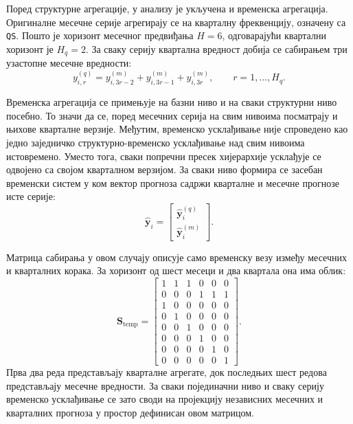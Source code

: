 \documentclass[12pt,oneside]{memoir}
\begin{document}
Поред структурне агрегације, у анализу је укључена и временска агрегација. Оригиналне месечне серије агрегирају се на кварталну фреквенцију, означену са \texttt{QS}. Пошто је хоризонт месечног предвиђања $H=6$, одговарајући квартални хоризонт је $H_q=2$. За сваку серију квартална вредност добија се сабирањем три узастопне месечне вредности:
\begin{equation}
    y^{(q)}_{i,r}
    =
    y^{(m)}_{i,3r-2}
    +
    y^{(m)}_{i,3r-1}
    +
    y^{(m)}_{i,3r},
    \qquad r = 1,\dots,H_q.
\end{equation}

Временска агрегација се примењује на базни ниво и на сваки структурни ниво посебно. То значи да се, поред месечних серија на свим нивоима посматрају и њихове кварталне верзије. Међутим, временско усклађивање није спроведено као једно заједничко структурно-временско усклађивање над свим нивоима истовремено. Уместо тога, сваки попречни пресек хијерархије усклађује се одвојено са својом кварталном верзијом. За сваки ниво формира се засебан временски систем у ком вектор прогноза садржи кварталне и месечне прогнозе исте серије:
\begin{equation}
    \hat{\mathbf{y}}_{i}
    =
    \begin{bmatrix}
        \hat{\mathbf{y}}^{(q)}_{i} \\
        \hat{\mathbf{y}}^{(m)}_{i}
    \end{bmatrix}.
\end{equation}

Матрица сабирања у овом случају описује само временску везу између месечних и кварталних корака. За хоризонт од шест месеци и два квартала она има облик:
\begin{equation}
    \mathbf{S}_{\mathrm{temp}}
    =
    \begin{bmatrix}
        1 & 1 & 1 & 0 & 0 & 0 \\
        0 & 0 & 0 & 1 & 1 & 1 \\
        1 & 0 & 0 & 0 & 0 & 0 \\
        0 & 1 & 0 & 0 & 0 & 0 \\
        0 & 0 & 1 & 0 & 0 & 0 \\
        0 & 0 & 0 & 1 & 0 & 0 \\
        0 & 0 & 0 & 0 & 1 & 0 \\
        0 & 0 & 0 & 0 & 0 & 1
    \end{bmatrix}.
\end{equation}
Прва два реда представљају кварталне агрегате, док последњих шест редова представљају месечне вредности. За сваки појединачни ниво и сваку серију временско усклађивање се зато своди на пројекцију независних месечних и кварталних прогноза у простор дефинисан овом матрицом.
\end{document}
